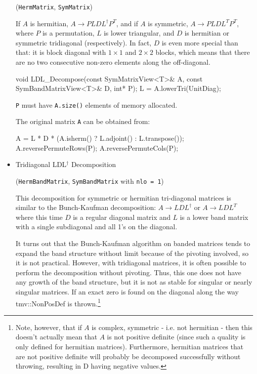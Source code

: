 \documentclass[twoside,letterpaper,11pt]{article}
\renewcommand{\tt}[1]{{\lstinline {#1}}}
\begin{document}
\begin{itemize}
(\tt{HermMatrix}, \tt{SymMatrix})

If $A$ is hermitian, $A \rightarrow P L D L^\dagger P^T$,
and if $A$ is symmetric, $A \rightarrow P L D L^T P^T$, where $P$ is a permutation,
$L$ is lower triangular, and $D$ is hermitian or symmetric tridiagonal (respectively).  
In fact, $D$ is even more special than that: it is block diagonal with $1 \times 1$
and $2 \times 2$ blocks,
which means that there are no two consecutive
non-zero elements along the off-diagonal.

\begin{tmvcode}
void LDL_Decompose(const SymMatrixView<T>& A, 
      const SymBandMatrixView<T>& D, int* P);
L = A.lowerTri(UnitDiag);
\end{tmvcode}
\tt{P} must have \tt{A.size()} elements of memory allocated.

The original matrix \tt{A} can be obtained from:
\begin{tmvcode}
A = L * D * (A.isherm() ? L.adjoint() : L.transpose());
A.reversePermuteRows(P);
A.reversePermuteCols(P);
\end{tmvcode}

\item Tridiagonal LDL$^\dagger$ Decomposition 

(\tt{HermBandMatrix}, \tt{SymBandMatrix} with \tt{nlo = 1})

This decomposition for symmetric or hermitian tri-diagonal matrices is 
similar to the Bunch-Kaufman decomposition: 
$A \rightarrow L D L^\dagger$
or $A \rightarrow L D L^T$ where this time $D$ is a regular diagonal matrix and $L$ is
a lower band matrix with a single subdiagonal and all 1's on the diagonal.

It turns out
that the Bunch-Kaufman algorithm on banded matrices tends to expand the band structure
without limit because of the pivoting involved, so it is not practical.
However, with tridiagonal matrices, it is often possible to perform the 
decomposition without pivoting.  Thus, this one does not have any growth of the band structure,
but it is not as stable for singular or nearly singular matrices.
If an exact zero is found on the diagonal along the way
tmv::NonPosDef is thrown.\footnote{
Note, however, that if $A$ is complex, symmetric - i.e. not hermitian -
then this doesn't actually mean that $A$ is not positive definite (since such a 
quality is only defined for hermitian matrices).  Furthermore, 
hermitian matrices that are not positive definite will probably be decomposed successfully
without throwing, resulting in D having negative values.

}
\end{itemize}
\end{document}
